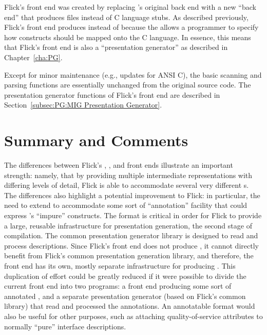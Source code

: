 {Flick's \MIG{} front end was created by replacing \MIG{}'s original back end
with a new ``back end'' that produces \PRESC{} files instead of C language
stubs.  As described previously, Flick's \MIG{} front end produces \PRESC{}
instead of \AOI{} because the \MIG{} \IDL{} allows a programmer to specify how
\IDL{} constructs should be mapped onto the C language.  In essence, this means
that Flick's \MIG{} front end is also a ``presentation generator'' as described
in Chapter~\ref{cha:PG}.

Except for minor maintenance (e.g., updates for ANSI C), the basic scanning and
parsing functions are essentially unchanged from the original \MIG{} source
code.  The presentation generator functions of Flick's \MIG{} front end are
described in Section~\ref{subsec:PG:MIG Presentation Generator}.



\section{Summary and Comments}
\label{sec:FE:Summary and Comments}

The differences between Flick's \CORBA{}, \ONCRPC{}, and \MIG{} front ends
illustrate an important strength: namely, that by providing multiple
intermediate representations with differing levels of detail, Flick is able to
accommodate several very different \IDL{}s.  The differences also highlight a
potential improvement to Flick: in particular, the need to extend \AOI{} to
accommodate some sort of ``annotation'' facility that could express \MIG{}'s
``impure'' constructs.
%
The \AOI{} format is critical in order for Flick to provide a large, reusable
infrastructure for presentation generation, the second stage of \IDL{}
compilation.  The common presentation generator library is designed to read and
process \AOI{} descriptions.  Since Flick's \MIG{} front end does not produce
\AOI{}, it cannot directly benefit from Flick's common presentation generation
library, and therefore, the \MIG{} front end has its own, mostly separate
infrastructure for producing \PRESC{}\@.  This duplication of effort could be
greatly reduced if it were possible to divide the current \MIG{} front end into
two programs: a front end producing some sort of annotated \AOI{}, and a
separate presentation generator (based on Flick's common library) that read and
processed the annotations.  An annotatable \AOI{} format would also be useful
for other purposes, such as attaching quality-of-service attributes to normally
``pure'' \CORBA{} interface descriptions.

}

